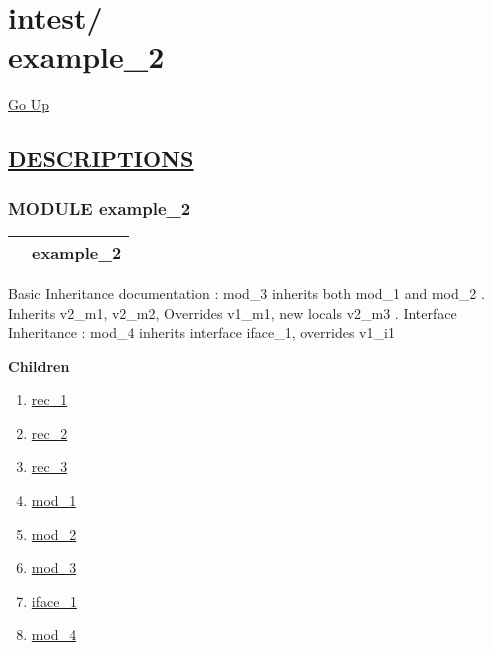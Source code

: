 \chapter*{\color{headfile}
{\large intest\slash\hspace{0pt}}
 \\
example_2
}
\hypertarget{ecldoc:toc:intest.example_2}{}
\hyperlink{ecldoc:toc:root/intest}{Go Up}


\section*{\underline{\textsf{DESCRIPTIONS}}}
\subsection*{\textsf{\colorbox{headtoc}{\color{white} MODULE}
example\_2}}

\hypertarget{ecldoc:intest.example_2}{}

{\renewcommand{\arraystretch}{1.5}
\begin{tabularx}{\textwidth}{|>{\raggedright\arraybackslash}l|X|}
\hline
\hspace{0pt}\mytexttt{\color{red} } & \textbf{example\_2} \\
\hline
\end{tabularx}
}

\par
Basic Inheritance documentation : mod\_3 inherits both mod\_1 and mod\_2 . Inherits v2\_m1, v2\_m2, Overrides v1\_m1, new locals v2\_m3 . Interface Inheritance : mod\_4 inherits interface iface\_1, overrides v1\_i1


\textbf{Children}
\begin{enumerate}
\item \hyperlink{ecldoc:intest.example_2.rec_1}{rec\_1}
\item \hyperlink{ecldoc:intest.example_2.rec_2}{rec\_2}
\item \hyperlink{ecldoc:intest.example_2.rec_3}{rec\_3}
\item \hyperlink{ecldoc:intest.example_2.mod_1}{mod\_1}
\item \hyperlink{ecldoc:intest.example_2.mod_2}{mod\_2}
\item \hyperlink{ecldoc:intest.example_2.mod_3}{mod\_3}
\item \hyperlink{ecldoc:intest.example_2.iface_1}{iface\_1}
\item \hyperlink{ecldoc:intest.example_2.mod_4}{mod\_4}
\end{enumerate}

